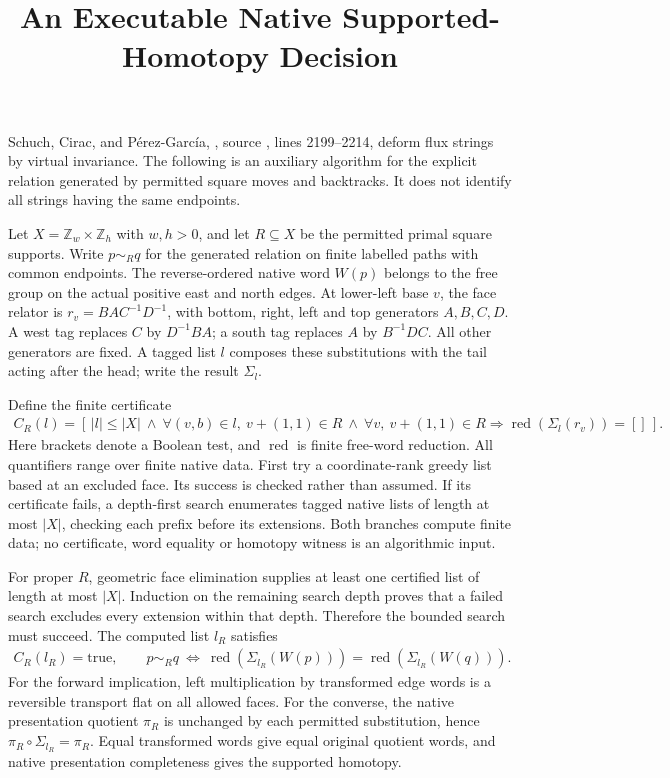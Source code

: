 \documentclass{article}
\title{An Executable Native Supported-Homotopy Decision}
\author{}
\date{}
\begin{document}
\maketitle
{}

Schuch, Cirac, and P\'erez-Garc\'ia,
\cite[Lemma~6.14]{Schuch2010PEPS}, source
, lines 2199--2214, deform flux strings
by virtual invariance. The following is an auxiliary algorithm for the
explicit relation generated by permitted square moves and backtracks.
It does not identify all strings having the same endpoints.

Let $X=\mathbb Z_w\times\mathbb Z_h$ with $w,h>0$, and let $R\subseteq X$
be the permitted primal square supports. Write $p\sim_Rq$ for the generated
relation on finite labelled paths with common endpoints. The reverse-ordered
native word $W(p)$ belongs to the free group on the actual positive east and
north edges. At lower-left base $v$, the face relator is
$r_v=BAC^{-1}D^{-1}$, with bottom, right, left and top generators $A,B,C,D$.
A west tag replaces $C$ by $D^{-1}BA$; a south tag replaces $A$ by $B^{-1}DC$.
All other generators are fixed. A tagged list $l$ composes these substitutions
with the tail acting after the head; write the result $\Sigma_l$.

Define the finite certificate
\begin{align}
    C_R(l)=
    [\,|l|\le |X|\ \land\
    \forall(v,b)\in l,\ v+(1,1)\in R\ \land\
    \forall v,\ v+(1,1)\in R\Rightarrow
    \operatorname{red}(\Sigma_l(r_v))=[]\,].
    \label{eq:scp10_executable_face_certificate}
\end{align}
Here brackets denote a Boolean test, and $\operatorname{red}$ is finite
free-word reduction. All quantifiers range over finite native data.
First try a coordinate-rank greedy list based at an excluded face.
Its success is checked rather than assumed. If its certificate fails,
a depth-first search enumerates tagged native lists of length at most $|X|$,
checking each prefix before its extensions. Both branches compute finite data;
no certificate, word equality or homotopy witness is an algorithmic input.

For proper $R$, geometric face elimination supplies at least one certified
list of length at most $|X|$. Induction on the remaining search depth proves
that a failed search excludes every extension within that depth. Therefore
the bounded search must succeed. The computed list $l_R$ satisfies
\begin{align}
    C_R(l_R)=\mathrm{true},\qquad
    p\sim_Rq\ \Longleftrightarrow\
    \operatorname{red}(\Sigma_{l_R}(W(p)))
    =\operatorname{red}(\Sigma_{l_R}(W(q))).
    \label{eq:scp10_executable_proper_support}
\end{align}
For the forward implication, left multiplication by transformed edge words
is a reversible transport flat on all allowed faces. For the converse, the
native presentation quotient $\pi_R$ is unchanged by each permitted
substitution, hence $\pi_R\circ\Sigma_{l_R}=\pi_R$. Equal transformed words
give equal original quotient words, and native presentation completeness
gives the supported homotopy.
\end{document}
